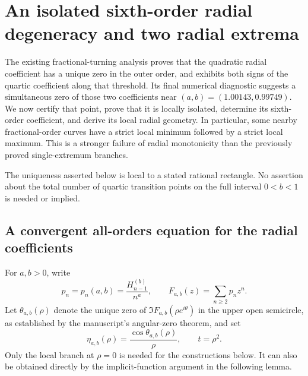 \section{An isolated sixth-order radial degeneracy and two radial extrema}
\label{rd:sec:main}

The existing fractional-turning analysis proves that the quadratic radial
coefficient has a unique zero in the outer order, and exhibits both signs
of the quartic coefficient along that threshold. Its final numerical
diagnostic suggests a simultaneous zero of those two coefficients near
$(a,b)=(1.00143,0.99749)$. We now certify that point, prove that it is
locally isolated, determine its sixth-order coefficient, and derive its
local radial geometry. In particular, some nearby fractional-order curves
have a strict local minimum followed by a strict local maximum. This is
a stronger failure of radial monotonicity than the previously proved
single-extremum branches.

The uniqueness asserted below is local to a stated rational rectangle.
No assertion about the total number of quartic transition points on the
full interval $0<b<1$ is needed or implied.

\subsection{A convergent all-orders equation for the radial coefficients}

For $a,b>0$, write
\[
 p_n=p_n(a,b)=\frac{H_{n-1}^{(b)}}{n^a},\qquad
 F_{a,b}(z)=\sum_{n\ge2}p_nz^n.
\]
Let $\theta_{a,b}(\rho)$ denote the unique zero of
$\Im F_{a,b}(\rho e^{i\theta})$ in the upper open semicircle, as
established by the manuscript's angular-zero theorem, and set
\[
 \eta_{a,b}(\rho)=\frac{\cos\theta_{a,b}(\rho)}{\rho},
 \qquad t=\rho^2.
\]
Only the local branch at $\rho=0$ is needed for the constructions below.
It can also be obtained directly by the implicit-function argument in
the following lemma.

